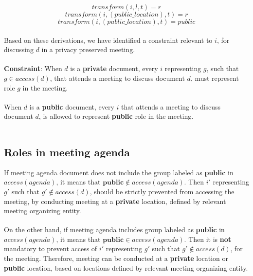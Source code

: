 \[ transform(i, l, t) = r \]
\[ transform(i, (public\_location), t) = r \]
\[ transform(i, (public\_location), t) = public \] \\
\noindent
Based on these derivations, we have identified a constraint relevant to $i$, for discussing $d$ in a privacy preserved meeting.\\ \\
\textbf{Constraint}: When $d$ is a \textbf{private} document, every $i$ representing $g$, such that $g \in access(d)$, that attends a meeting to discuss document $d$, must represent role $g$ in the meeting.\\ \\
When $d$ is a \textbf{public} document, every $i$ that attends a meeting to discuss document $d$, is allowed to represent \textbf{public} role in the meeting.\\ \\

\subsection{Roles in meeting agenda}
\noindent
If meeting agenda document does not include the group labeled as \textbf{public} in $access(agenda)$, it means that $\textbf{public} \notin access(agenda)$. Then $i'$ representing $g'$ such that $g' \notin access(d)$, should be strictly prevented from accessing the meeting, by conducting meeting at a \textbf{private} location, defined by relevant meeting organizing entity.\\ \\
On the other hand, if meeting agenda includes group labeled as \textbf{public} in $access(agenda)$, it means that $\textbf{public} \in access(agenda)$. Then it is \textbf{not} mandatory to prevent access of $i'$ representing $g'$ such that $g' \notin access(d)$, for the meeting. Therefore, meeting can be conducted at a \textbf{private} location or \textbf{public} location, based on locations defined by relevant meeting organizing entity.\\ \\

